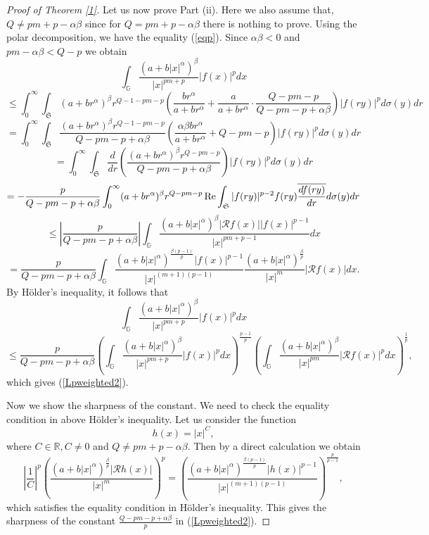 \documentclass[a4paper,12pt,reqno]{amsart}
\renewcommand\eqref[1]{(\ref{#1})} %
\numberwithin{equation}{section}
\theoremstyle{plain}
\theoremstyle{definition}
\renewcommand{\wp}{\mathfrak S}
\begin{document}
\begin{proof}[Proof of Theorem \ref{1}]
Let us now prove Part (ii). Here we also assume that, $Q\neq pm+p-\alpha\beta$ since for $Q=pm+p-\alpha\beta$ there is nothing
to prove. Using the polar decomposition, we have
the equality \eqref{eqp}.
Since $\alpha \beta<0$ and $pm-\alpha\beta<Q-p$ we obtain
$$
\int_{\mathbb{G}}
\frac{(a+b|x|^{\alpha})^{\beta}}{|x|^{pm+p}}|f(x)|^{p}dx$$
$$\leq\int_{0}^{\infty}\int_{\wp}
(a+br^{\alpha})^{\beta}r^{Q-1-pm-p}\left(\frac{b r^{\alpha}}{a+br^{\alpha}}+\frac{a}{a+br^{\alpha}}
\cdot\frac{Q-pm-p}{Q-pm-p+\alpha\beta}\right)|f(ry)|^{p} d\sigma(y)dr
$$
$$=\int_{0}^{\infty}\int_{\wp}
\frac{(a+br^{\alpha})^{\beta}r^{Q-1-pm-p}}{Q-pm-p+\alpha\beta}
\left(\frac{\alpha \beta b r^{\alpha}}{a+br^{\alpha}}+Q-pm-p\right)|f(ry)|^{p} d\sigma(y)dr
$$
$$=\int_{0}^{\infty}\int_{\wp}
\frac{d}{dr}\left(\frac{(a+br^{\alpha})^{\beta}
	r^{Q-pm-p}}{Q-pm-p+\alpha\beta}\right)|f(ry)|^{p}
d\sigma(y)dr$$
$$
=-\frac{p}{Q-pm-p+\alpha\beta}\int_{0}^{\infty}(a+br^{\alpha})^{\beta}r^{Q-pm-p}  \,{\rm Re}\int_{\wp}
|f(ry)|^{p-2} f(ry) \overline{\frac{df(ry)}{dr}}d\sigma(y)dr
$$
$$\leq \left|\frac{p}{Q-pm-p+\alpha\beta}\right|\int_{\mathbb{G}}\frac{(a+b|x|^{\alpha})^{\beta}|\mathcal{R}f(x)||f(x)|^{p-1}}{|x|^{pm+p-1}}dx
$$
$$=\frac{p}{Q-pm-p+\alpha\beta}
\int_{\mathbb{G}}\frac{(a+b|x|^{\alpha})^
{\frac{\beta(p-1)}{p}}|f(x)|^{p-1}}{|x|^{(m+1)(p-1)}}
\frac{(a+b|x|^{\alpha})^
{\frac{\beta}{p}}}{|x|^{m}}|\mathcal{R}f(x)|dx.$$
By H\"{o}lder's inequality, it follows that
$$
\int_{\mathbb{G}}
\frac{(a+b|x|^{\alpha})^{\beta}}{|x|^{pm+p}}|f(x)|^{p}dx$$
$$\leq\frac{p}{Q-pm-p+\alpha\beta}\left(\int_{\mathbb{G}}\frac{(a+b|x|^{\alpha})^{\beta}}{|x|^{pm+p}}|f(x)|^{p}dx\right)^\frac{p-1}{p}
\left(\int_{\mathbb{G}}\frac{(a+b|x|^{\alpha})^{\beta}}{|x|^{pm}}|\mathcal{R}f(x)|^{p}dx\right)^\frac{1}{p},
$$
which gives \eqref{Lpweighted2}.

Now we show the sharpness of the constant. We need to check the equality
condition in above H\"older's inequality.
Let us consider the function
$$h(x)=|x|^{C}, $$
where $C\in\mathbb{R}, C\neq 0$ and $Q\neq pm+p-\alpha\beta$. Then by a direct calculation we obtain
\begin{equation}\label{Holder_eq2}
\left|\frac{1}{C}\right|^{p}\left(\frac{(a+b|x|^{\alpha})^
{\frac{\beta}{p}}|\mathcal{R}h(x)|}{|x|^{m}}\right)^{p}=\left(\frac{(a+b|x|^{\alpha})^
{\frac{\beta(p-1)}{p}}|h(x)|^{p-1}}
{|x|^{(m+1) (p-1)}}\right)^{\frac{p}{p-1}},
\end{equation}
which satisfies the equality condition in H\"older's inequality.
This gives the sharpness of the constant $\frac{Q-pm-p+\alpha\beta}{p}$
in \eqref{Lpweighted2}.
\end{proof}
\end{document}
